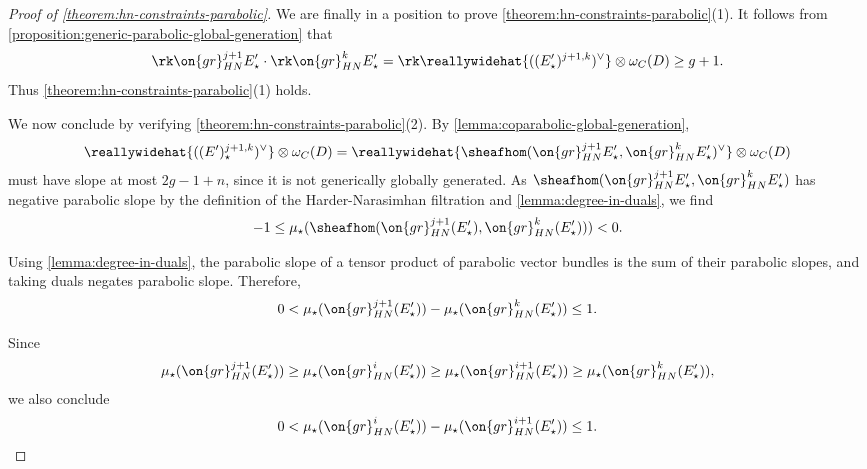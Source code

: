 \begin{proof}[Proof of \autoref{theorem:hn-constraints-parabolic}]
We are finally in a position to prove \autoref{theorem:hn-constraints-parabolic}(1).
It follows from \autoref{proposition:generic-parabolic-global-generation} that $$\rk
\on{gr}^{j+1}_{HN}E_\star'\cdot \rk \on{gr}^k_{HN}E_\star'= \rk
\reallywidehat{((E'_\star)^{j+1,k})^\vee}
\otimes \omega_C(D) \geq g+1.$$ Thus \autoref{theorem:hn-constraints-parabolic}(1) holds.

We now conclude by verifying \autoref{theorem:hn-constraints-parabolic}(2).
By \autoref{lemma:coparabolic-global-generation},
\begin{align*}
\reallywidehat{((E')_\star^{j+1,k})^\vee} \otimes \omega_C(D) =
	\reallywidehat{\sheafhom(\on{gr}^{j+1}_{HN}E_\star',
	\on{gr}^{k}_{HN} E_\star')^\vee} \otimes \omega_C(D)
\end{align*}
must have slope at most $2g-1+n$, since it is not generically globally generated.
As $\sheafhom(\on{gr}^{j+1}_{HN}E_\star', \on{gr}^{k}_{HN} E_\star')$ has
negative parabolic slope by the
definition of the Harder-Narasimhan filtration and
\autoref{lemma:degree-in-duals}, we find
\begin{align*}
	-1 \leq \mu_\star(\sheafhom(\on{gr}^{j+1}_{HN}(E_\star'),
	\on{gr}^{k}_{HN}(E_\star'))) < 0.
\end{align*}

Using \autoref{lemma:degree-in-duals},
the parabolic slope of a tensor product of parabolic vector bundles is the sum of their
parabolic slopes, and taking duals negates parabolic slope.
Therefore,
\begin{align*}
	0 < \mu_\star(\on{gr}^{j+1}_{HN}({E}_\star')) -
	\mu_\star(\on{gr}^{k}_{HN}({E}_\star'))
	\leq 1.
\end{align*}

Since
\begin{align*}
	\mu_\star(\on{gr}^{j+1}_{HN}({E}_\star')) \geq
\mu_\star(\on{gr}^{i}_{HN}({E}_\star')) \geq
\mu_\star(\on{gr}^{i+1}_{HN}({E}_\star')) \geq
\mu_\star(\on{gr}^{k}_{HN}({E}_\star')),
\end{align*}
we also conclude
\[
	0 < \mu_\star(\on{gr}^{i}_{HN}({E}_\star')) -
	\mu_\star(\on{gr}^{i+1}_{HN}({E}_\star')) \leq 1.\qedhere
\]
\end{proof}


